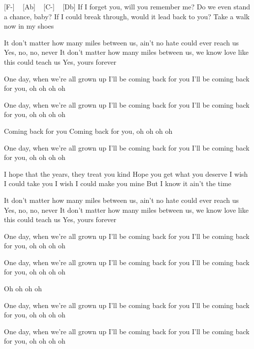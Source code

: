 [F-] ~ [Ab] ~ [C-] ~ [Db]
 If I forget you, will you remember me?
Do we even stand a chance, baby?
If I could break through, would it lead back to you?
Take a walk now in my shoes


It don't matter how many miles between us, ain't no hate could ever reach us
Yes, no, no, never
It don't matter how many miles between us, we know love like this could teach us
Yes, yours forever

One day, when we're all grown up
I'll be coming back for you
I'll be coming back for you, oh oh oh oh

One day, when we're all grown up
I'll be coming back for you
I'll be coming back for you, oh oh oh oh

Coming back for you
Coming back for you, oh oh oh oh


One day, when we're all grown up
I'll be coming back for you
I'll be coming back for you, oh oh oh oh

I hope that the years, they treat you kind
Hope you get what you deserve
I wish I could take you
I wish I could make you mine
But I know it ain't the time

It don't matter how many miles between us, ain't no hate could ever reach us
Yes, no, no, never
It don't matter how many miles between us, we know love like this could teach us
Yes, yours forever


One day, when we're all grown up
I'll be coming back for you
I'll be coming back for you, oh oh oh oh

One day, when we're all grown up
I'll be coming back for you
I'll be coming back for you, oh oh oh oh

Oh oh oh oh

One day, when we're all grown up
I'll be coming back for you
I'll be coming back for you, oh oh oh oh

One day, when we're all grown up
I'll be coming back for you
I'll be coming back for you, oh oh oh oh

